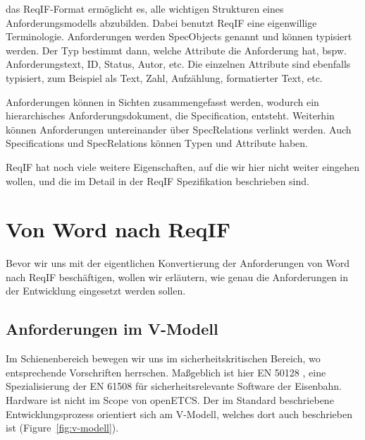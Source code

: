 \documentclass[twoside]{article}
\begin{document}
\begin{multicols}{2}
das ReqIF-Format ermöglicht es, alle wichtigen Strukturen eines Anforderungsmodells abzubilden.  Dabei benutzt ReqIF eine eigenwillige Terminologie.  Anforderungen werden SpecObjects genannt und können typisiert werden.  Der Typ bestimmt dann, welche Attribute die Anforderung hat, bspw. Anforderungstext, ID, Status, Autor, etc. Die einzelnen Attribute sind ebenfalls typisiert, zum Beispiel als Text, Zahl, Aufzählung, formatierter Text, etc.

Anforderungen können in Sichten zusammengefasst werden, wodurch ein hierarchisches Anforderungsdokument, die Specification, entsteht.  Weiterhin können Anforderungen untereinander über SpecRelations verlinkt werden. Auch Specifications und SpecRelations können Typen und Attribute haben.

ReqIF hat noch viele weitere Eigenschaften, auf die wir hier nicht weiter eingehen wollen, und die im Detail in der ReqIF Spezifikation \cite{reqif} beschrieben sind.

\section{Von Word nach ReqIF}

Bevor wir uns mit der eigentlichen Konvertierung der Anforderungen von Word nach ReqIF beschäftigen, wollen wir erläutern, wie genau die Anforderungen in der Entwicklung eingesetzt werden sollen.

\subsection{Anforderungen im V-Modell}

Im Schienenbereich bewegen wir uns im sicherheitskritischen Bereich, wo entsprechende Vorschriften herrschen.  Maßgeblich ist hier EN 50128 \cite{en50128}, eine Spezialisierung der EN 61508 für sicherheitsrelevante Software der Eisenbahn.  Hardware ist nicht im Scope von openETCS.  Der im Standard beschriebene Entwicklungsprozess orientiert sich am V-Modell, welches dort auch beschrieben ist (Figure~\ref{fig:v-modell}). 


\end{multicols}
\end{document}
